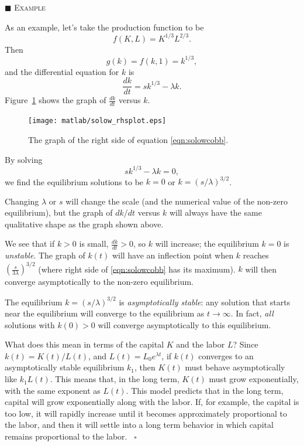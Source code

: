 \documentclass[reqno]{immbook}
\numberwithin{equation}{chapter}
\numberwithin{question}{section}
\numberwithin{theorem}{chapter}
\numberwithin{figure}{chapter}
\theoremstyle{definition}
\newenvironment{xexample}%
{%

\medskip\noindent\addtocounter{example}{1}$\blacksquare$ \textsc{Example \theexample}\hspace*{1em}%
}%
{%
~\hfill$\square$

\medskip
}
\begin{document}
\medskip
\begin{xexample}
\label{exm:solow}
As an example, let's take the production function to be
\begin{equation}
   f(K,L) = K^{1/3}L^{2/3}.
\label{eqn:cobbexample}
\end{equation}
Then
\begin{equation}
g(k) = f(k,1) = k^{1/3},
\end{equation}
 and the differential equation for
$k$ is
\begin{equation}
   \frac{dk}{dt} = sk^{1/3} - \lambda k .
\label{eqn:solowcobb}
\end{equation}
Figure~\ref{fig:solow_rhsplot} shows the graph of
$\frac{dk}{dt}$ versus $k$.
\begin{figure}
\centerline{\texttt{[image: matlab/solow\_rhsplot.eps]}}
\caption{The graph of the right side of equation \eqref{eqn:solowcobb}.}
\label{fig:solow_rhsplot}
\end{figure}

By solving
\[
   sk^{1/3} - \lambda k = 0,
\]
we find the equilibrium solutions to be $k=0$ or $k=(s/\lambda)^{3/2}$.


Changing $\lambda$ or $s$ will change the scale
(and the numerical value of the non-zero equilibrium),
but the graph of $dk/dt$ versus $k$ will always have the
same qualitative shape as the graph shown above.

We see that if $k>0$ is small,
$\frac{dk}{dt} > 0$, so $k$
will increase; the equilibrium $k=0$ is \emph{unstable}.
The graph of $k(t)$ will have an inflection point when $k$ reaches
$\left(\frac{s}{3\lambda}\right)^{3/2}$
(where right side of \eqref{eqn:solowcobb} has its maximum).
$k$ will then converge asymptotically to the non-zero equilibrium.

The equilibrium $k=(s/\lambda)^{3/2}$ is \emph{asymptotically stable}:
any solution that starts near the equilibrium will converge to the equilibrium
as $t\rightarrow \infty$.
In fact, \emph{all} solutions with $k(0)>0$ will converge asymptotically to this
equilibrium.

What does this mean in terms of the capital $K$ and the labor $L$?
Since $k(t) = K(t)/L(t)$, and $L(t) = L_0e^{\lambda t}$, if $k(t)$ converges to an
asymptotically stable equilibrium $k_1$, then $K(t)$ must behave asymptotically like
$k_1  L(t)$.  This means that, in the long term, $K(t)$ must 
grow exponentially, with the
same exponent as $L(t)$.
This model predicts that in the long term, capital will grow
exponentially along with the labor.
If, for example, the capital is too low, it will rapidly increase until it becomes
approximately proportional to the labor, and then it will settle into a long term behavior in
which capital remains proportional to the labor.
\end{xexample}
\end{document}
